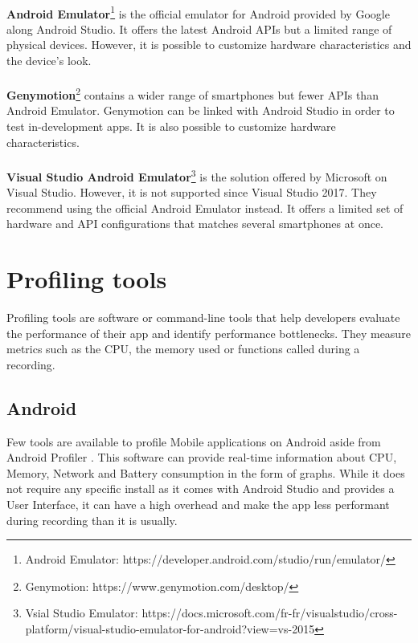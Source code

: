 \documentclass{kththesis}
\begin{document}
\paragraph{}
\textbf{Android Emulator}\footnote{Android Emulator: https://developer.android.com/studio/run/emulator/} is the official emulator for Android provided by Google along Android Studio. It offers the latest Android APIs but a limited range of physical devices. However, it is possible to customize hardware characteristics and the device's look.

\paragraph{}
\textbf{Genymotion}\footnote{Genymotion: https://www.genymotion.com/desktop/} contains a wider range of smartphones but fewer APIs than Android Emulator. Genymotion can be linked with Android Studio in order to test in-development apps. It is also possible to customize hardware characteristics.

\paragraph{}
\textbf{Visual Studio Android Emulator}\footnote{Vsial Studio Emulator: https://docs.microsoft.com/fr-fr/visualstudio/cross-platform/visual-studio-emulator-for-android?view=vs-2015} is the solution offered by Microsoft on Visual Studio. However, it is not supported since Visual Studio 2017. They recommend using the official Android Emulator instead. It offers a limited set of hardware and API configurations that matches several smartphones at once. 

\section{Profiling tools}

Profiling tools are software or command-line tools that help developers evaluate the performance of their app and identify performance bottlenecks. They measure metrics such as the CPU, the memory used or functions called during a recording.

\subsection{Android}

Few tools are available to profile Mobile applications on Android aside from Android Profiler \cite{nanoscope}. This software can provide real-time information about CPU, Memory, Network and Battery consumption in the form of graphs. While it does not require any specific install as it comes with Android Studio and provides a User Interface, it can have a high overhead \cite{nanoscope} and make the app less performant during recording than it is usually. 
\end{document}
